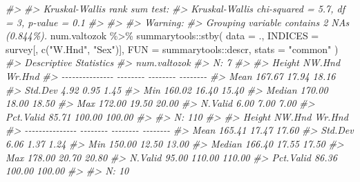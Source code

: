 \documentclass[
]{book}
\newenvironment{Shaded}{\begin{snugshade}}{\end{snugshade}}
\newcommand{\AttributeTok}[1]{\textcolor[rgb]{0.77,0.63,0.00}{#1}}
\newcommand{\CommentTok}[1]{\textcolor[rgb]{0.56,0.35,0.01}{\textit{#1}}}
\newcommand{\FunctionTok}[1]{\textcolor[rgb]{0.00,0.00,0.00}{#1}}
\newcommand{\NormalTok}[1]{#1}
\newcommand{\SpecialCharTok}[1]{\textcolor[rgb]{0.00,0.00,0.00}{#1}}
\newcommand{\StringTok}[1]{\textcolor[rgb]{0.31,0.60,0.02}{#1}}
\begin{document}
\begin{Shaded}
\begin{Highlighting}[]
\CommentTok{\#\textgreater{} }
\CommentTok{\#\textgreater{} Kruskal{-}Wallis rank sum test:}
\CommentTok{\#\textgreater{}   Kruskal{-}Wallis chi{-}squared = 5.7, df = 3, p{-}value = 0.1}
\CommentTok{\#\textgreater{} }
\CommentTok{\#\textgreater{} }
\CommentTok{\#\textgreater{} Warning:}
\CommentTok{\#\textgreater{}   Grouping variable contains 2 NAs (0.844\%).}
\NormalTok{num.valtozok }\SpecialCharTok{\%\textgreater{}\%}\NormalTok{ summarytools}\SpecialCharTok{::}\FunctionTok{stby}\NormalTok{(}
  \AttributeTok{data =}\NormalTok{ .,}
  \AttributeTok{INDICES =}\NormalTok{ survey[, }\FunctionTok{c}\NormalTok{(}\StringTok{"W.Hnd"}\NormalTok{, }\StringTok{"Sex"}\NormalTok{)], }
  \AttributeTok{FUN =}\NormalTok{ summarytools}\SpecialCharTok{::}\NormalTok{descr, }
  \AttributeTok{stats =} \StringTok{"common"} 
\NormalTok{)}
\CommentTok{\#\textgreater{} Descriptive Statistics  }
\CommentTok{\#\textgreater{} num.valtozok  }
\CommentTok{\#\textgreater{} N: 7  }
\CommentTok{\#\textgreater{} }
\CommentTok{\#\textgreater{}                   Height   NW.Hnd   Wr.Hnd}
\CommentTok{\#\textgreater{} {-}{-}{-}{-}{-}{-}{-}{-}{-}{-}{-}{-}{-}{-}{-} {-}{-}{-}{-}{-}{-}{-}{-} {-}{-}{-}{-}{-}{-}{-}{-} {-}{-}{-}{-}{-}{-}{-}{-}}
\CommentTok{\#\textgreater{}            Mean   167.67    17.94    18.16}
\CommentTok{\#\textgreater{}         Std.Dev     4.92     0.95     1.45}
\CommentTok{\#\textgreater{}             Min   160.02    16.40    15.40}
\CommentTok{\#\textgreater{}          Median   170.00    18.00    18.50}
\CommentTok{\#\textgreater{}             Max   172.00    19.50    20.00}
\CommentTok{\#\textgreater{}         N.Valid     6.00     7.00     7.00}
\CommentTok{\#\textgreater{}       Pct.Valid    85.71   100.00   100.00}
\CommentTok{\#\textgreater{} }
\CommentTok{\#\textgreater{} N: 110  }
\CommentTok{\#\textgreater{} }
\CommentTok{\#\textgreater{}                   Height   NW.Hnd   Wr.Hnd}
\CommentTok{\#\textgreater{} {-}{-}{-}{-}{-}{-}{-}{-}{-}{-}{-}{-}{-}{-}{-} {-}{-}{-}{-}{-}{-}{-}{-} {-}{-}{-}{-}{-}{-}{-}{-} {-}{-}{-}{-}{-}{-}{-}{-}}
\CommentTok{\#\textgreater{}            Mean   165.41    17.47    17.60}
\CommentTok{\#\textgreater{}         Std.Dev     6.06     1.37     1.24}
\CommentTok{\#\textgreater{}             Min   150.00    12.50    13.00}
\CommentTok{\#\textgreater{}          Median   166.40    17.55    17.50}
\CommentTok{\#\textgreater{}             Max   178.00    20.70    20.80}
\CommentTok{\#\textgreater{}         N.Valid    95.00   110.00   110.00}
\CommentTok{\#\textgreater{}       Pct.Valid    86.36   100.00   100.00}
\CommentTok{\#\textgreater{} }
\CommentTok{\#\textgreater{} N: 10  }

\end{Highlighting}
\end{Shaded}
\end{document}
